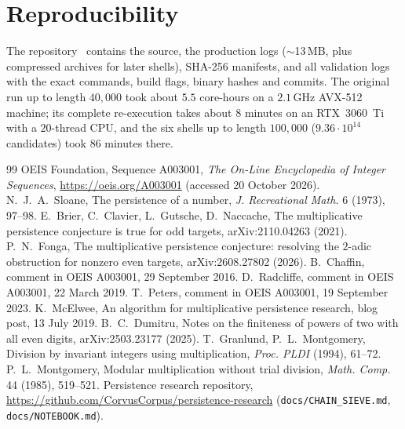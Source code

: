 \documentclass[11pt]{article}
\theoremstyle{definition}
\newcommand{\NB}{100{,}000}
\begin{document}
\section{Reproducibility}

The repository~\cite{repo} contains the source, the production logs ($\sim$13\,MB, plus compressed archives for
later shells), SHA-256 manifests, and all validation logs with the exact commands, build flags, binary hashes and
commits. The original run up to length $40{,}000$ took about $5.5$ core-hours on a $2.1$\,GHz AVX-512 machine; its
complete re-execution takes about $8$ minutes on an RTX~3060~Ti with a $20$-thread CPU, and the six shells up to length
$\NB$ ($9.36\cdot10^{14}$ candidates) took $86$ minutes there.

\begin{thebibliography}{99}
 OEIS Foundation, Sequence A003001, \emph{The On-Line Encyclopedia of Integer Sequences},
  \url{https://oeis.org/A003001} (accessed 20 October 2026).
 N.~J.~A.~Sloane, The persistence of a number, \emph{J. Recreational Math.} 6 (1973), 97--98.
 E.~Brier, C.~Clavier, L.~Gutsche, D.~Naccache, The multiplicative persistence conjecture is true for odd
  targets, arXiv:2110.04263 (2021).
 P.~N.~Fonga, The multiplicative persistence conjecture: resolving the $2$-adic obstruction for nonzero
  even targets, arXiv:2608.27802 (2026).
 B.~Chaffin, comment in OEIS A003001, 29 September 2016.
 D.~Radcliffe, comment in OEIS A003001, 22 March 2019.
 T.~Peters, comment in OEIS A003001, 19 September 2023.
 K.~McElwee, An algorithm for multiplicative persistence research, blog post, 13 July 2019.
 B.~C.~Dumitru, Notes on the finiteness of powers of two with all even digits, arXiv:2503.23177 (2025).
 T.~Granlund, P.~L.~Montgomery, Division by invariant integers using multiplication, \emph{Proc. PLDI}
  (1994), 61--72.
 P.~L.~Montgomery, Modular multiplication without trial division, \emph{Math. Comp.} 44 (1985),
  519--521.
 Persistence research repository, \url{https://github.com/CorvusCorpus/persistence-research}
  (\texttt{docs/CHAIN\_SIEVE.md}, \texttt{docs/NOTEBOOK.md}).
\end{thebibliography}
\end{document}
